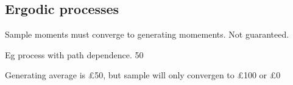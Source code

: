 
\subsection{Ergodic processes}

Sample moments must converge to generating momements. Not guaranteed.

Eg process with path dependence. 50%

Generating average is £50, but sample will only convergen to £100 or £0

